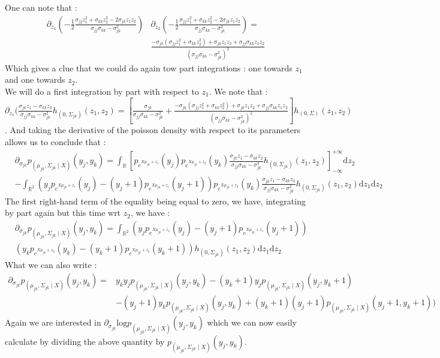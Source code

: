 \documentclass[11pt, a4paper]{article}
\begin{document}
One can note that :
\begin{align*}
\partial_{z_1} ( - \frac{1}{2} \frac{\sigma_{jj} z_1^2 + \sigma_{kk} z_2^2 - 2 \sigma_{jk} z_1 z_2 }{\sigma_{jj} \sigma_{kk}-  \sigma_{jk}^2} ) & \partial_{z_2} ( - \frac{1}{2} \frac{\sigma_{jj} z_1^2 + \sigma_{kk} z_2^2 - 2 \sigma_{jk} z_1 z_2 }{\sigma_{jj} \sigma_{kk}-  \sigma_{jk}^2} ) =\\
&  \frac{-\sigma_{jk} ( \sigma_{jj} z_1^2 + \sigma_{kk} z_2^2 ) + \sigma_{jk} z_1 z_2 + \sigma_{jj} \sigma_{kk} z_1 z_2}{(\sigma_{jj} \sigma_{kk} - \sigma_{jk}^2)^2}
\end{align*}
Which gives a clue that we could do again tow part integrations : one towards $z_1$ and one towards $z_2$. \\
We will do a first integration by part with respect to $z_1$. We note that : $ \partial_{z_1} ( \frac{\sigma_{jk}z_1-\sigma_{kk}z_2}{\sigma_{jj} \sigma_{kk}- \sigma_{jk}^2} h_{(0,\Sigma_{jk})}(z_1,z_2) = [\frac{\sigma_{jk}}{\sigma_{jj} \sigma_{kk} - \sigma_{jk}^2} + \frac{-\sigma_{jk} ( \sigma_{jj} z_1^2 + \sigma_{kk} z_2^2 ) + \sigma_{jk} z_1 z_2 + \sigma_{jj} \sigma_{kk} z_1 z_2}{(\sigma_{jj} \sigma_{kk} - \sigma_{jk}^2)^2}] h_{(0,\Sigma)}(z_1,z_2)$. And taking the derivative of the poisson density with respect to its parameters allows us to conclude that :
\begin{align*}
&\partial_{\sigma_{jk}}p_{(\mu_{jk},\Sigma_{jk} \mid X)}(y_j,y_k) = \int_{\mathbb{R}} [ p_{e^{X\mu_{jk}+z_1}}(y_j) p_{e^{X\mu_{jk}+z_2}}(y_k) \frac{\sigma_{jk}z_1-\sigma_{kk}z_2}{\sigma_{jj} \sigma_{kk}- \sigma_{jk}^2} h_{(0,\Sigma_{jk})}(z_1,z_2)]_{- \infty}^{+ \infty} \mathrm{d}z_2\\
& - \int_{\mathbb{R}^2} (y_j p_{e^{X\mu_{jk}+z_1}}(y_j)- (y_j+1) p_{e^{X\mu_{jk}+z_1}}(y_j+1)) p_{e^{X\mu_{jk}+z_2}}(y_k) \frac{\sigma_{jk} z_1 - \sigma_{kk} z_2}{\sigma_{jj} \sigma_{kk} - \sigma_{jk}^2} h_{(0,\Sigma_{jk})}(z_1,z_2) \mathrm{d}z_1  \mathrm{d}z_2
\end{align*}
The first right-hand term of the equality being equal to zero, we have, integrating by part again but this time wrt $z_2$, we have :
\begin{align*}
&\partial_{\sigma_{jk}}p_{(\mu_{jk},\Sigma_{jk} \mid X)}(y_j,y_k) =\int_{\mathbb{R}^2} (y_j p_{e^{X\mu_{jk}+z_1}}(y_j)- (y_j+1) p_{e^{X\mu_{jk}+z_1}}(y_j+1))\\
& (y_k p_{e^{X\mu_{jk}+z_2}}(y_k)-(y_k + 1) p_{e^{X\mu_{jk}+z_2}}(y_k+1))  h_{(0,\Sigma_{jk})}(z_1,z_2) \mathrm{d}z_1  \mathrm{d}z_2
\end{align*}
What we can also write :
\begin{align*}
\partial_{\sigma_{jk}}p_{(\mu_{jk},\Sigma_{jk} \mid X)}(y_j,y_k) = &y_k y_j p_{(\mu_{jk},\Sigma_{jk} \mid X)}(y_j,y_k)-(y_k+1)y_j p_{(\mu_{jk},\Sigma_{jk} \mid X)}(y_j,y_k+1)\\
& -(y_j+1)y_k p_{(\mu_{jk},\Sigma_{jk} \mid X)}(y_j,y_k)+ (y_k+1) (y_j+1)p_{(\mu_{jk},\Sigma_{jk} \mid X)}(y_j+1,y_k+1))
\end{align*}
Again we are interested in $\partial_{\sigma_{jk}}\mathrm{log}p_{(\mu_{jk},\Sigma_{jk} \mid X)}(y_j,y_k)$ which we can now easily calculate by dividing the above quantity by $p_{(\mu_{jk},\Sigma_{jk} \mid X)}(y_j,y_k)$.
\end{document}
